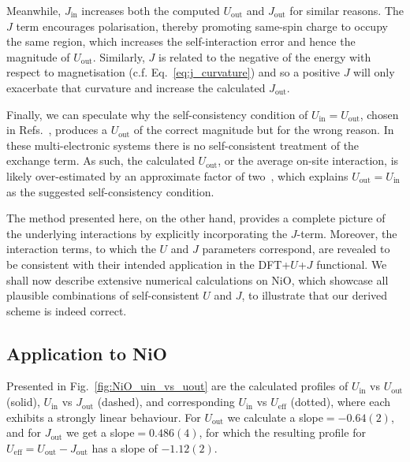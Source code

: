 Meanwhile, 
$J_\textrm{in}$ increases both the computed 
$U_\textrm{out}$ and $J_\textrm{out}$ 
for similar reasons.
%
The $J$ term encourages polarisation, 
thereby promoting same-spin charge to occupy the same region, 
which increases the self-interaction error 
and hence the magnitude of $U_\textrm{out}$.
%
Similarly, $J$ is related to the 
negative of the energy with respect to magnetisation 
(c.f. Eq.~\eqref{eq:j_curvature}) 
and so a positive $J$ will only exacerbate that curvature 
and increase the calculated $J_\textrm{out}$.


Finally, 
we can speculate why the self-consistency condition 
of $U_\textrm{in}=U_\textrm{out}$,
chosen in Refs.~\cite{doi:10.1021/jp070549l,0953-8984-22-5-055602,PhysRevB.84.115108,PhysRevB.93.085135,PhysRevLett.106.118501,doi:10.1063/1.4947240}, 
produces a $U_\textrm{out}$ of the correct magnitude 
but for the wrong reason. 
%
In these multi-electronic systems 
there is no self-consistent treatment of the exchange term.
%
As such, 
the calculated $U_\textrm{out}$, 
or the average on-site interaction, 
is likely over-estimated by an approximate factor of two~\cite{doi:10.1021/jp070549l,PhysRevB.93.085135}, 
which explains $U_\textrm{out}=U_\textrm{in}$ 
as the suggested self-consistency condition.

The method presented here, 
on the other hand, 
provides a complete picture of 
the underlying interactions by 
explicitly incorporating the $J$-term.
%
Moreover, 
the interaction terms, 
to which the $U$ and $J$ parameters correspond, 
are revealed to be consistent with their 
intended application in the DFT+$U$+$J$ functional.
%
We shall now describe extensive numerical calculations on NiO, 
which showcase all plausible combinations of self-consistent $U$ and $J$, 
to illustrate that our derived scheme is indeed correct.



\subsection{Application to NiO}

Presented in Fig.~\ref{fig:NiO_uin_vs_uout} 
are the calculated profiles of 
$U_\textrm{in}$ vs $U_\textrm{out}$ (solid), 
$U_\textrm{in}$ vs $J_\textrm{out}$ (dashed), 
and corresponding 
$U_\textrm{in}$ vs $U_\textrm{eff}$ (dotted), 
where each exhibits a strongly linear behaviour.
%
For $U_\textrm{out}$ we calculate a 
slope$=-0.64(2)$, 
and for $J_\textrm{out}$ we get a 
slope$=0.486(4)$, 
for which the resulting profile for 
$U_\textrm{eff}=U_\textrm{out}-J_\textrm{out}$ 
has a  slope of $-1.12(2)$.

